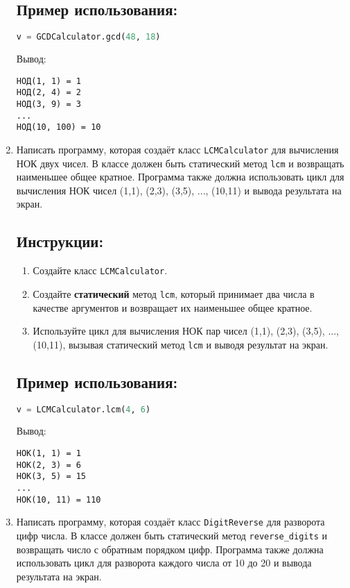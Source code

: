 \begin{enumerate}
\subsection*{Пример использования:}
\begin{lstlisting}[language=Python]
    v = GCDCalculator.gcd(48, 18)
\end{lstlisting}
Вывод:
\begin{verbatim}
НОД(1, 1) = 1
НОД(2, 4) = 2
НОД(3, 9) = 3
...
НОД(10, 100) = 10
\end{verbatim}

\item
Написать программу, которая создаёт класс \texttt{LCMCalculator} 
для вычисления НОК двух чисел. В классе должен быть статический метод
\texttt{lcm} и возвращать наименьшее общее кратное. 
Программа также должна использовать цикл для вычисления НОК чисел 
(1,1), (2,3), (3,5), ..., (10,11) и вывода результата на экран.

\subsection*{Инструкции:}
\begin{enumerate}
    \item Создайте класс \texttt{LCMCalculator}.
    \item Создайте \textbf{статический} метод \texttt{lcm}, который принимает два числа в качестве аргументов и возвращает их наименьшее общее кратное.
    \item Используйте цикл для вычисления НОК пар чисел (1,1), (2,3), (3,5), ..., (10,11), вызывая статический метод \texttt{lcm} и выводя результат на экран.
\end{enumerate}

\subsection*{Пример использования:}
\begin{lstlisting}[language=Python]
    v = LCMCalculator.lcm(4, 6)
\end{lstlisting}
Вывод:
\begin{verbatim}
НОК(1, 1) = 1
НОК(2, 3) = 6
НОК(3, 5) = 15
...
НОК(10, 11) = 110
\end{verbatim}

\item
Написать программу, которая создаёт класс \texttt{DigitReverse} 
для разворота цифр числа. В классе должен быть статический метод
\texttt{reverse\_digits} и возвращать число с обратным порядком цифр. 
Программа также должна использовать цикл для разворота каждого числа от 
10 до 20 и вывода результата на экран.


\end{enumerate}
